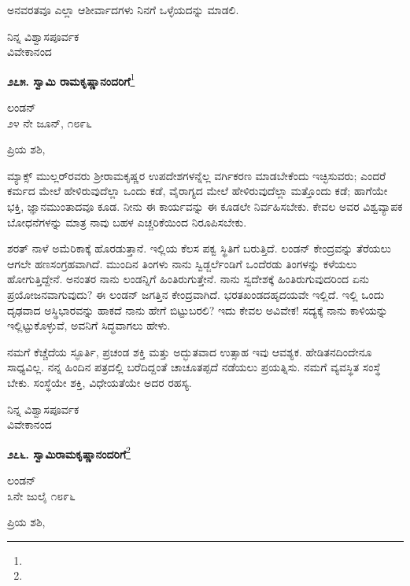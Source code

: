 ಅನವರತವೂ ಎಲ್ಲಾ ಆಶೀರ್ವಾದಗಳು ನಿನಗೆ ಒಳ್ಳೆಯದನ್ನು ಮಾಡಲಿ.

{\flushright
ನಿನ್ನ ವಿಶ್ವಾಸಪೂರ್ವಕ\\ವಿವೇಕಾನಂದ\par}

\begin{center}
\textbf{೨೭೫. ಸ್ವಾಮಿ ರಾಮಕೃಷ್ಣಾನಂದರಿಗೆ}\footnote{}
\end{center}

\begin{flushright}
ಲಂಡನ್\\೨೪ ನೇ ಜೂನ್, ೧೮೯೬
\end{flushright}

\noindent
ಪ್ರಿಯ ಶಶಿ,

ಮ್ಯಾಕ್ಸ್ ಮುಲ್ಲರ್‌ರವರು ಶ‍್ರೀರಾಮಕೃಷ್ಣರ ಉಪದೇಶಗಳನ್ನೆಲ್ಲ ವರ್ಗಿಕರಣ ಮಾಡಬೇಕೆಂದು ಇಚ್ಛಿಸುವರು; ಎಂದರೆ ಕರ್ಮದ ಮೇಲೆ ಹೇಳಿರುವುದೆಲ್ಲಾ ಒಂದು ಕಡೆ, ವೈರಾಗ್ಯದ ಮೇಲೆ ಹೇಳಿರುವುದೆಲ್ಲಾ ಮತ್ತೊಂದು ಕಡೆ; ಹಾಗೆಯೇ ಭಕ್ತಿ, ಜ್ಞಾನ\break ಮುಂತಾದವೂ ಕೂಡ. ನೀನು ಈ ಕಾರ್ಯವನ್ನು ಈ ಕೂಡಲೇ ನಿರ್ವಹಿಸಬೇಕು. ಕೇವಲ ಅವರ ವಿಶ್ವವ್ಯಾಪಕ ಬೋಧನೆಗಳನ್ನು ಮಾತ್ರ ನಾವು ಬಹಳ ಎಚ್ಚರಿಕೆಯಿಂದ ನಿರೂಪಿಸಬೇಕು.

ಶರತ್ ನಾಳೆ ಅಮೆರಿಕಾಕ್ಕೆ ಹೊರಡುತ್ತಾನೆ. ಇಲ್ಲಿಯ ಕೆಲಸ ಪಕ್ವ ಸ್ಥಿತಿಗೆ ಬರುತ್ತಿದೆ. ಲಂಡನ್ ಕೇಂದ್ರವನ್ನು ತೆರೆಯಲು ಆಗಲೇ ಹಣಸಂಗ್ರಹವಾಗಿದೆ. ಮುಂದಿನ ತಿಂಗಳು ನಾನು ಸ್ವಿಡ್ಜರ್ಲೆಂಡಿಗೆ ಒಂದೆರಡು ತಿಂಗಳನ್ನು ಕಳೆಯಲು ಹೋಗುತ್ತಿದ್ದೇನೆ. ಅನಂತರ ನಾನು ಲಂಡನ್ನಿಗೆ ಹಿಂತಿರುಗುತ್ತೇನೆ. ನಾನು ಸ್ವದೇಶಕ್ಕೆ ಹಿಂತಿರುಗುವುದರಿಂದ ಏನು ಪ್ರಯೋಜನವಾಗುವುದು? ಈ ಲಂಡನ್ ಜಗತ್ತಿನ ಕೇಂದ್ರವಾಗಿದೆ. ಭರತಖಂಡದ\break ಹೃದಯವೇ ಇಲ್ಲಿದೆ. ಇಲ್ಲಿ ಒಂದು ದೃಢವಾದ ಅಸ್ಥಿಭಾರವನ್ನು ಹಾಕದೆ ನಾನು ಹೇಗೆ ಬಿಟ್ಟುಬರಲಿ? ಇದು ಕೇವಲ ಅವಿವೇಕ! ಸದ್ಯಕ್ಕೆ ನಾನು ಕಾಳಿಯನ್ನು ಇಲ್ಲಿಟ್ಟುಕೊಳ್ಳುವೆ, ಅವನಿಗೆ ಸಿದ್ಧವಾಗಲು ಹೇಳು.

ನಮಗೆ ಕೆಚ್ಚೆದೆಯ ಸ್ಫೂರ್ತಿ, ಪ್ರಚಂಡ ಶಕ್ತಿ ಮತ್ತು ಅದ್ಭುತವಾದ ಉತ್ಸಾಹ ಇವು ಆವಶ್ಯಕ. ಹೇಡಿತನದಿಂದೇನೂ ಸಾಧ್ಯವಿಲ್ಲ. ನನ್ನ ಹಿಂದಿನ ಪತ್ರದಲ್ಲಿ ಬರೆದಿದ್ದಂತೆ ಚಾಚೂತಪ್ಪದೆ ನಡೆಯಲು ಪ್ರಯತ್ನಿಸು. ನಮಗೆ ವ್ಯವಸ್ಥಿತ ಸಂಸ್ಥೆ ಬೇಕು. ಸಂಸ್ಥೆಯೇ ಶಕ್ತಿ, ವಿಧೇಯತೆಯೇ ಅದರ ರಹಸ್ಯ.

{\flushright
ನಿನ್ನ ವಿಶ್ವಾಸಪೂರ್ವಕ\\ವಿವೇಕಾನಂದ\par}

\begin{center}
\textbf{೨೭೬. ಸ್ವಾಮಿರಾಮಕೃಷ್ಣಾನಂದರಿಗೆ}\footnote{}
\end{center}

\begin{flushright}
ಲಂಡನ್\\೩ನೇ ಜುಲೈ ೧೮೯೬
\end{flushright}

\noindent
ಪ್ರಿಯ ಶಶಿ,

